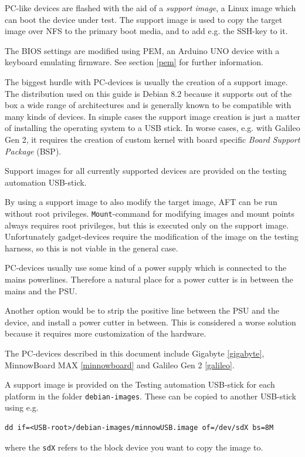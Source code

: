 \documentclass[a4paper,11pt]{article}
\newcommand{\cmd}[1]{\texttt{#1}}
\begin{document}
PC-like devices are flashed with the aid of a \textit{support image}, a Linux image which can boot the device under test. The support image is used to copy the target image over NFS to the primary boot media, and to add e.g. the SSH-key to it.

The BIOS settings are modified using PEM, an Arduino UNO device with a keyboard emulating firmware. See section \ref{pem} for further information.

The biggest hurdle with PC-devices is usually the creation of a support image. The distribution used on this guide is Debian 8.2 because it supports out of the box a wide range of architectures and is generally known to be compatible with many kinds of devices. In simple cases the support image creation is just a matter of installing the operating system to a USB stick. In worse cases, e.g. with Galileo Gen 2, it requires the creation of custom kernel with board specific \textit{Board Support Package} (BSP).

Support images for all currently supported devices are provided on the testing automation USB-stick.

By using a support image to also modify the target image, AFT can be run without root privileges. \cmd{Mount}-command for modifying images and mount points always requires root privileges, but this is executed only on the support image. Unfortunately gadget-devices require the modification of the image on the testing harness, so this is not viable in the general case.

PC-devices usually use some kind of a power supply which is connected to the mains powerlines. Therefore a natural place for a power cutter is in between the mains and the PSU.

Another option would be to strip the positive line between the PSU and the device, and install a power cutter in between. This is considered a worse solution because it requires more customization of the hardware.

The PC-devices described in this document include Gigabyte \ref{gigabyte}, MinnowBoard MAX \ref{minnowboard} and Galileo Gen 2 \ref{galileo}. 

A support image is provided on the Testing automation USB-stick for each platform in the folder \cmd{debian-images}. These can be copied to another USB-stick using e.g.
\begin{lstlisting}
dd if=<USB-root>/debian-images/minnowUSB.image of=/dev/sdX bs=8M
\end{lstlisting}
where the \cmd{sdX} refers to the block device you want to copy the image to.
\end{document}
